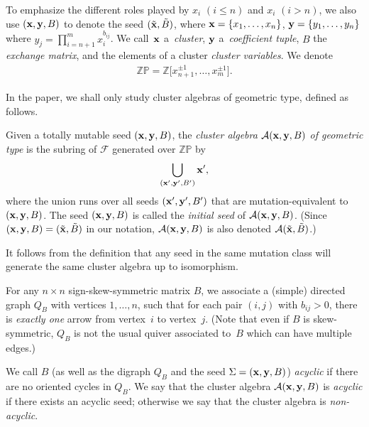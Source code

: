 To emphasize the dif\/ferent roles played by $x_i$ $(i\le n)$ and $x_i$ $(i>n)$, we also use $({\bf x},{\bf y},B)$ to denote the seed $(\tilde{\bf x}, \tilde{B})$, where ${\bf x}=\{x_1,\dots,x_n\}$, ${\bf y}=\{y_1,\dots,y_n\}$ where $y_j=\prod\limits_{i=n+1}^mx_i^{b_{ij}}$. We call~${\bf x}$ a~\emph{cluster}, ${\bf y}$ a~\emph{coefficient tuple}, $B$ the \emph{exchange matrix}, and the elements of a cluster \emph{cluster variables}. We denote
\begin{gather*}
\mathbb{ZP}=\mathbb{Z}\big[x_{n+1}^{\pm1},\dots,x_m^{\pm1}\big].
\end{gather*}

In the paper, we shall only study cluster algebras of geometric type, def\/ined as follows.

\begin{Definition}
Given a totally mutable seed $({\bf x}, {\bf y},B)$, the \emph{cluster algebra} $\mathcal{A}({\bf x},{\bf y},B)$ \emph{of geometric type} is the subring of $\mathcal{F}$ generated over $\mathbb{ZP}$ by
\begin{gather*}
\bigcup_{({\bf x}',{\bf y}',B')} {\bf x}',
 \end{gather*}
 where the union runs over all seeds $({\bf x}', {\bf y}',B')$ that are mutation-equivalent to $({\bf x},{\bf y},B)$. The seed $({\bf x},{\bf y},B)$ is called the \emph{initial seed} of $\mathcal{A}({\bf x},{\bf y},B)$. (Since $({\bf x},{\bf y},B)=(\tilde{\bf x},\tilde{B})$ in our notation, $\mathcal{A}({\bf x},{\bf y},B)$ is also denoted $\mathcal{A}(\tilde{\bf x},\tilde{B})$.)
\end{Definition}

It follows from the def\/inition that any seed in the same mutation class will generate the same cluster algebra up to isomorphism.

 For any $n \times n$ sign-skew-symmetric matrix $B$, we associate a (simple) directed graph $Q_B$ with vertices $1,\ldots,n$, such that for each pair $(i,j)$ with $b_{ij}>0$, there is  \emph{exactly one} arrow from vertex~$i$ to vertex~$j$.
(Note that even if $B$ is skew-symmetric, $Q_B$ is not the usual quiver associated to~$B$ which can have multiple edges.)


 We call $B$ (as well as the digraph $Q_B$ and the seed $\Sigma=({\bf x},{\bf y},B)$) \emph{acyclic} if there are no oriented cycles in $Q_B$.
We say that the cluster algebra $\mathcal{A}({\bf x},{\bf y},B)$ is \emph{acyclic} if there exists an acyclic seed; otherwise we say that the cluster algebra is \emph{non-acyclic}.

